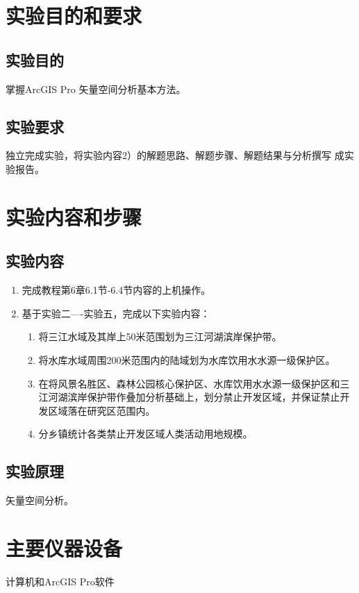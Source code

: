 \documentclass{zjureport}
\begin{document}
\makeheader

\section{实验目的和要求}
\subsection{实验目的}
掌握ArcGIS Pro 矢量空间分析基本方法。

\subsection{实验要求}
独立完成实验，将实验内容2）的解题思路、解题步骤、解题结果与分析撰写
成实验报告。


\section{实验内容和步骤}

\subsection{实验内容}

\begin{enumerate}
    \item 完成教程第6章6.1节-6.4节内容的上机操作。
    \item 基于实验二----实验五，完成以下实验内容：
    \begin{enumerate}
        \item 将三江水域及其岸上50米范围划为三江河湖滨岸保护带。
        \item 将水库水域周围200米范围内的陆域划为水库饮用水水源一级保护区。
        \item 在将风景名胜区、森林公园核心保护区、水库饮用水水源一级保护区和三江河湖滨岸保护带作叠加分析基础上，划分禁止开发区域，并保证禁止开发区域落在研究区范围内。
        \item 分乡镇统计各类禁止开发区域人类活动用地规模。
    \end{enumerate}
\end{enumerate}

\subsection{实验原理}
矢量空间分析。 


\section{主要仪器设备}
计算机和ArcGIS Pro软件
\end{document}
